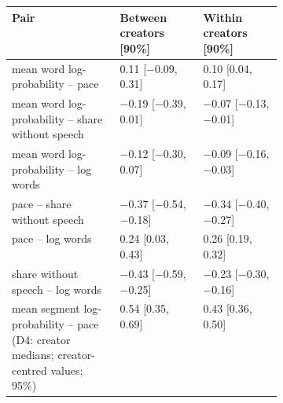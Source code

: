 {\scriptsize\setlength{\tabcolsep}{3pt}
\begin{tabular}{@{}p{0.4\linewidth}ll@{}}
\toprule
Pair & Between creators [90\%] & Within creators [90\%] \\
\midrule
mean word log-probability -- pace & 0.11 [\ensuremath{-}0.09, 0.31] & 0.10 [0.04, 0.17] \\
mean word log-probability -- share without speech & \ensuremath{-}0.19 [\ensuremath{-}0.39, 0.01] & \ensuremath{-}0.07 [\ensuremath{-}0.13, \ensuremath{-}0.01] \\
mean word log-probability -- log words & \ensuremath{-}0.12 [\ensuremath{-}0.30, 0.07] & \ensuremath{-}0.09 [\ensuremath{-}0.16, \ensuremath{-}0.03] \\
pace -- share without speech & \ensuremath{-}0.37 [\ensuremath{-}0.54, \ensuremath{-}0.18] & \ensuremath{-}0.34 [\ensuremath{-}0.40, \ensuremath{-}0.27] \\
pace -- log words & 0.24 [0.03, 0.43] & 0.26 [0.19, 0.32] \\
share without speech -- log words & \ensuremath{-}0.43 [\ensuremath{-}0.59, \ensuremath{-}0.25] & \ensuremath{-}0.23 [\ensuremath{-}0.30, \ensuremath{-}0.16] \\
\midrule
mean segment log-probability -- pace (D4: creator medians; creator-centred values; 95\%) & 0.54 [0.35, 0.69] & 0.43 [0.36, 0.50] \\
\bottomrule
\end{tabular}}
